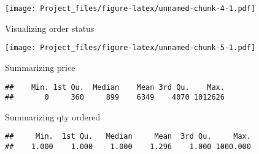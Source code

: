 \documentclass[
]{article}
\newenvironment{Shaded}{\begin{snugshade}}{\end{snugshade}}
\newcommand{\CommentTok}[1]{\textcolor[rgb]{0.56,0.35,0.01}{\textit{#1}}}
\newcommand{\DataTypeTok}[1]{\textcolor[rgb]{0.13,0.29,0.53}{#1}}
\newcommand{\DecValTok}[1]{\textcolor[rgb]{0.00,0.00,0.81}{#1}}
\newcommand{\FloatTok}[1]{\textcolor[rgb]{0.00,0.00,0.81}{#1}}
\newcommand{\KeywordTok}[1]{\textcolor[rgb]{0.13,0.29,0.53}{\textbf{#1}}}
\newcommand{\NormalTok}[1]{#1}
\newcommand{\OperatorTok}[1]{\textcolor[rgb]{0.81,0.36,0.00}{\textbf{#1}}}
\newcommand{\StringTok}[1]{\textcolor[rgb]{0.31,0.60,0.02}{#1}}
\begin{document}
\texttt{[image: Project\_files/figure-latex/unnamed-chunk-4-1.pdf]}

Visualizing order status

\begin{Shaded}
\end{Shaded}

\texttt{[image: Project\_files/figure-latex/unnamed-chunk-5-1.pdf]}

Summarizing price

\begin{Shaded}
\end{Shaded}

\begin{verbatim}
##    Min. 1st Qu.  Median    Mean 3rd Qu.    Max. 
##       0     360     899    6349    4070 1012626
\end{verbatim}

Summarizing qty ordered

\begin{Shaded}
\end{Shaded}

\begin{verbatim}
##     Min.  1st Qu.   Median     Mean  3rd Qu.     Max. 
##    1.000    1.000    1.000    1.296    1.000 1000.000
\end{verbatim}
\end{document}

